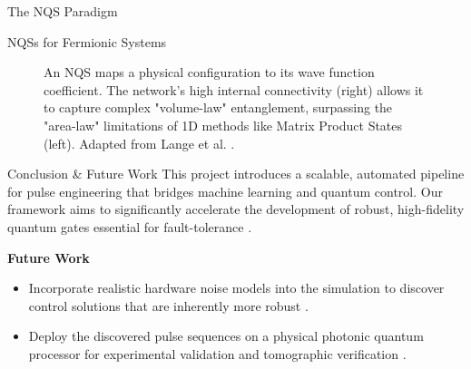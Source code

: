 \documentclass[final]{beamer}
\newlength{\colwidth}
\begin{document}
\begin{frame}[t]
\begin{columns}[t]
\begin{column}{\colwidth}
\begin{block}{The NQS Paradigm}
\begin{exampleblock}{NQSs for Fermionic Systems}
\begin{figure}
      \vspace{24px}
      \caption{ \centering \scriptsize An NQS maps a physical configuration to its wave function coefficient. The network's high internal connectivity (right) allows it to capture complex "volume-law" entanglement, surpassing the "area-law" limitations of 1D methods like Matrix Product States (left). Adapted from Lange et al. \cite{Lange2024Review, Carleo2017Science}.}
    \end{figure}
    \end{exampleblock}
\end{block}

  \begin{block}{Conclusion \& Future Work}
    This project introduces a scalable, automated pipeline for pulse engineering that bridges machine learning and quantum control. Our framework aims to significantly accelerate the development of robust, high-fidelity quantum gates essential for fault-tolerance \cite{Berni2025Proposal}.
    
    \textbf{Future Work}
    \begin{itemize}
      \item Incorporate realistic hardware noise models into the simulation to discover control solutions that are inherently more robust \cite{Berni2025Proposal}.
      \item Deploy the discovered pulse sequences on a physical photonic quantum processor for experimental validation and tomographic verification \cite{Berni2025Proposal}.
    \end{itemize}
  \end{block}
  

\end{column}
\end{columns}
\end{frame}
\end{document}
